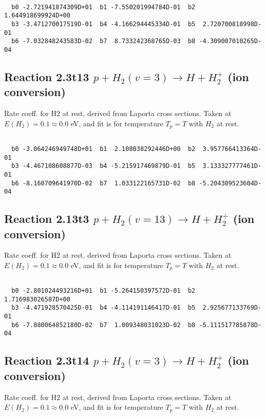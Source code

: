 \begin{small}\begin{verbatim}

  b0 -2.721941874309D+01  b1 -7.550201994784D-01  b2  1.644918699924D+00
  b3 -3.471270017519D-01  b4 -4.166294445334D-01  b5  2.720700818998D-01
  b6 -7.032848243583D-02  b7  8.733242368765D-03  b8 -4.309007010265D-04

\end{verbatim}\end{small}

\newpage
\subsection{
Reaction 2.3t13
$ p + H_2(v=3) \rightarrow H + H_2^+$ (ion conversion)
}
Rate coeff. for H2 at rest, derived from Laporta cross sections.
Taken at $E(H_2) = 0.1 \approx 0.0$ eV,  and fit is for temperature $T_p=T$ with $H_2$ at rest.

\begin{small}\begin{verbatim}

  b0 -3.064246949748D+01  b1  2.108038292446D+00  b2  3.957766413364D-01
  b3 -4.467108608877D-03  b4 -5.215917469879D-01  b5  3.133327777461D-01
  b6 -8.160709641970D-02  b7  1.033122165731D-02  b8 -5.204309523604D-04

\end{verbatim}\end{small}

\newpage
\subsection{
Reaction 2.13t3
$ p + H_2(v=13) \rightarrow H + H_2^+$ (ion conversion)
}
Rate coeff. for H2 at rest, derived from Laporta cross sections.
Taken at $E(H_2) = 0.1 \approx 0.0$ eV,  and fit is for temperature $T_p=T$ with $H_2$ at rest.

\begin{small}\begin{verbatim}

  b0 -2.801024493216D+01  b1 -5.264150397572D-01  b2  1.716983026587D+00
  b3 -4.471928570425D-01  b4 -4.114191146417D-01  b5  2.925677133769D-01
  b6 -7.880064852180D-02  b7  1.009348031023D-02  b8 -5.111517785878D-04

\end{verbatim}\end{small}

\newpage
\subsection{
Reaction 2.3t14
$ p + H_2(v=3) \rightarrow H + H_2^+$ (ion conversion)
}
Rate coeff. for H2 at rest, derived from Laporta cross sections.
Taken at $E(H_2) = 0.1 \approx 0.0$ eV,  and fit is for temperature $T_p=T$ with $H_2$ at rest.

